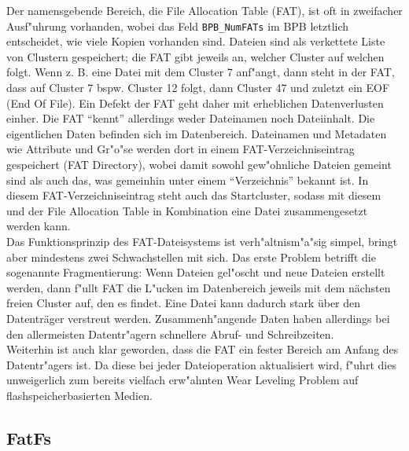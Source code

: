 \documentclass[11pt]{article}
\newcommand{\cpp}[1]{\texttt{#1}}
\begin{document}
Der namensgebende Bereich, die File Allocation Table (FAT), ist oft in zweifacher Ausf"uhrung vorhanden, wobei das Feld 
\cpp{BPB_NumFATs} im BPB letztlich entscheidet, wie viele Kopien vorhanden sind. 
Dateien sind als verkettete Liste von Clustern gespeichert; die FAT gibt jeweils an, welcher Cluster auf welchen folgt.
Wenn z. B. eine Datei mit dem Cluster 7 anf"angt, dann steht in der FAT, dass auf Cluster 7 bspw. Cluster 12 folgt, dann Cluster 47 und 
zuletzt ein EOF (End Of File). Ein Defekt der FAT geht daher mit erheblichen Datenverlusten einher.
Die FAT \enquote{kennt} allerdings weder Dateinamen noch Dateiinhalt.
Die eigentlichen Daten befinden sich im Datenbereich. Dateinamen und Metadaten wie Attribute und Gr"o"se werden dort
in einem FAT-Verzeichniseintrag gespeichert (FAT Directory), wobei damit sowohl gew"ohnliche Dateien
gemeint sind als auch das, was gemeinhin unter einem \enquote{Verzeichnis} bekannt ist. In diesem FAT-Verzeichniseintrag
steht auch das Startcluster, sodass mit diesem und der File Allocation Table in Kombination eine Datei zusammengesetzt
werden kann. \\
Das Funktionsprinzip des FAT-Dateisystems ist verh"altnism"a"sig simpel, bringt aber mindestens zwei Schwachstellen
mit sich. Das erste Problem betrifft die sogenannte Fragmentierung: Wenn Dateien gel"oscht und neue Dateien erstellt werden, 
dann f"ullt FAT die L"ucken im Datenbereich jeweils mit dem nächsten freien Cluster auf,
den es findet. Eine Datei kann dadurch stark über den Datenträger verstreut werden. Zusammenh"angende Daten 
haben allerdings bei den allermeisten Datentr"agern schnellere Abruf- und Schreibzeiten. \\
Weiterhin ist auch klar geworden, dass die FAT ein fester Bereich am Anfang des Datentr"agers ist.
Da diese bei jeder Dateioperation aktualisiert wird, f"uhrt dies unweigerlich zum bereits vielfach erw"ahnten 
Wear Leveling Problem auf flashspeicherbasierten Medien.


\subsection{FatFs}\label{sec:fatfs}
\end{document}
